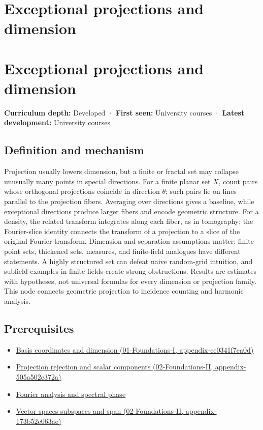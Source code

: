 \hypertarget{appendix-3c73f7862157}{}
\section*{Exceptional projections and dimension}
\section{Exceptional projections and dimension}\label{exceptional-projections-and-dimension}

\textbf{Curriculum depth:} Developed · \textbf{First seen:} University courses · \textbf{Latest development:} University courses

\subsection{Definition and mechanism}\label{definition-and-mechanism}

Projection usually lowers dimension, but a finite or fractal set may collapse unusually many points in special directions. For a finite planar set \(X\), count pairs whose orthogonal projections coincide in direction \(\theta\); such pairs lie on lines parallel to the projection fibers. Averaging over directions gives a baseline, while exceptional directions produce larger fibers and encode geometric structure. For a density, the related transform integrates along each fiber, as in tomography; the Fourier-slice identity connects the transform of a projection to a slice of the original Fourier transform. Dimension and separation assumptions matter: finite point sets, thickened sets, measures, and finite-field analogues have different statements. A highly structured set can defeat naive random-grid intuition, and subfield examples in finite fields create strong obstructions. Results are estimates with hypotheses, not universal formulas for every dimension or projection family. This node connects geometric projection to incidence counting and harmonic analysis.

\subsection{Prerequisites}\label{prerequisites}

\begin{itemize}
\tightlist
\item
  \href{}{Basis coordinates and dimension (01-Foundations-I, appendix-ce0341f7ea0d)}
\item
  \href{}{Projection rejection and scalar components (02-Foundations-II, appendix-505a502c372a)}
\item
  \hyperref[appendix-b60686ba06a1]{Fourier analysis and spectral phase}
\item
  \href{}{Vector spaces subspaces and span (02-Foundations-II, appendix-173b52c063ae)}
\end{itemize}

